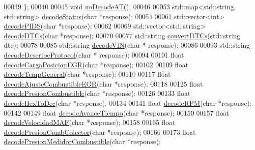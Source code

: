 \begin{DoxyCode}
00039 \};
00040 
00045 \textcolor{keywordtype}{void} \hyperlink{decoders_8hpp_a8ee851a37675f190ea728d6b2f0cdc92}{noDecodeAT}();
00046 
00053 std::map<std::string, std::string> \hyperlink{decoders_8hpp_aca9cad863d8603615597a0291804c8ae}{decodeStatus}(\textcolor{keywordtype}{char} *response);
00054 
00061 std::vector<int> \hyperlink{decoders_8hpp_aef44cca306ed9c74b146d2b7dd058763}{decodePIDS}(\textcolor{keywordtype}{char} *response);
00062 
00069 std::vector<std::string> \hyperlink{decoders_8hpp_aac9b3d4ea17ee4dbbdf755b0b510137a}{decodeDTCs}(\textcolor{keywordtype}{char} *response);
00070 
00077 std::string \hyperlink{decoders_8hpp_a4f18f411252f4c60fae4af320989c262}{convertDTCs}(std::string dtc);
00078 
00085 std::string \hyperlink{decoders_8hpp_a66754738119854c13a74265e209083e4}{decodeVIN}(\textcolor{keywordtype}{char} * response);
00086 
00093 std::string \hyperlink{decoders_8hpp_ab83ce79cd098ea655f3812488e304a0c}{decodeDescribeProtocol}(\textcolor{keywordtype}{char} * response);
00094 
00101 \textcolor{keywordtype}{float} \hyperlink{decoders_8hpp_adbe68794075963c37e654d53b8a46f68}{decodeCargaPosicionEGR}(\textcolor{keywordtype}{char} *response);
00102 
00109 \textcolor{keywordtype}{float} \hyperlink{decoders_8hpp_af581438645d7ff67766fa2e5eba5eaf9}{decodeTempGeneral}(\textcolor{keywordtype}{char} *response);
00110 
00117 \textcolor{keywordtype}{float} \hyperlink{decoders_8hpp_aeee9e6d8511a934b3a3644b19de3f2b7}{decodeAjusteCombustibleEGR}(\textcolor{keywordtype}{char} *response);
00118 
00125 \textcolor{keywordtype}{float} \hyperlink{decoders_8hpp_ab1c03e72734d4127a1c48f3b5a44a2e2}{decodePresionCombustible}(\textcolor{keywordtype}{char} *response);
00126 
00133 \textcolor{keywordtype}{float} \hyperlink{decoders_8hpp_aa7c5243702d5462e4b638450e750624e}{decodeHexToDec}(\textcolor{keywordtype}{char} *response);
00134 
00141 \textcolor{keywordtype}{float} \hyperlink{decoders_8hpp_a889868c7b1e554aee496e6aed7101cc4}{decodeRPM}(\textcolor{keywordtype}{char} *response);
00142 
00149 \textcolor{keywordtype}{float} \hyperlink{decoders_8hpp_a7a2fee87eace8ad6c86c628f5f91b3b5}{decodeAvanceTiempo}(\textcolor{keywordtype}{char} *response);
00150 
00157 \textcolor{keywordtype}{float} \hyperlink{decoders_8hpp_adceefeb78a70b295b378f4c472630aa1}{decodeVelocidadMAF}(\textcolor{keywordtype}{char} *response);
00158 
00165 \textcolor{keywordtype}{float} \hyperlink{decoders_8hpp_a3e32aaf8ced989570e141f01210564f3}{decodePresionCombColector}(\textcolor{keywordtype}{char} *response);
00166 
00173 \textcolor{keywordtype}{float} \hyperlink{decoders_8hpp_a228605d8cad0901a691ba4155a2326fc}{decodePresionMedidorCombustible}(\textcolor{keywordtype}{char} *response);

\end{DoxyCode}
